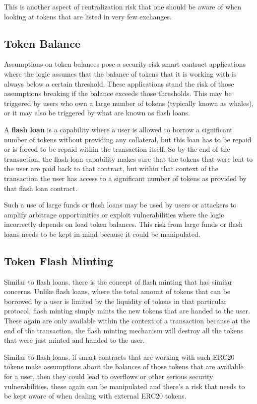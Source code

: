 This is another aspect of centralization risk that one should be aware
of when looking at tokens that are listed in very few exchanges.

\subsection{Token Balance}\label{token-balance}

Assumptions on token balances pose a security risk smart contract
applications where the logic assumes that the balance of tokens that it
is working with is always below a certain threshold. These applications
stand the risk of those assumptions breaking if the balance exceeds
those thresholds. This may be triggered by users who own a large number
of tokens (typically known as whales), or it may also be triggered by
what are known as flash loans.

A \textbf{flash loan} is a capability where a user is allowed to borrow
a significant number of tokens without providing any collateral, but
this loan has to be repaid or is forced to be repaid within the
transaction itself. So by the end of the transaction, the flash loan
capability makes sure that the tokens that were lent to the user are
paid back to that contract, but within that context of the transaction
the user has access to a significant number of tokens as provided by
that flash loan contract.

Such a use of large funds or flash loans may be used by users or
attackers to amplify arbitrage opportunities or exploit vulnerabilities
where the logic incorrectly depends on load token balances. This risk
from large funds or flash loans needs to be kept in mind because it
could be manipulated.

\subsection{Token Flash Minting}\label{token-flash-minting}

Similar to flash loans, there is the concept of flash minting that has
similar concerns. Unlike flash loans, where the total amount of tokens
that can be borrowed by a user is limited by the liquidity of tokens in
that particular protocol, flash minting simply mints the new tokens that
are handed to the user. These again are only available within the
context of a transaction because at the end of the transaction, the
flash minting mechanism will destroy all the tokens that were just
minted and handed to the user.

Similar to flash loans, if smart contracts that are working with such
ERC20 tokens make assumptions about the balances of those tokens that
are available for a user, then they could lead to overflows or other
serious security vulnerabilities, these again can be manipulated and
there's a risk that needs to be kept aware of when dealing with external
ERC20 tokens.
